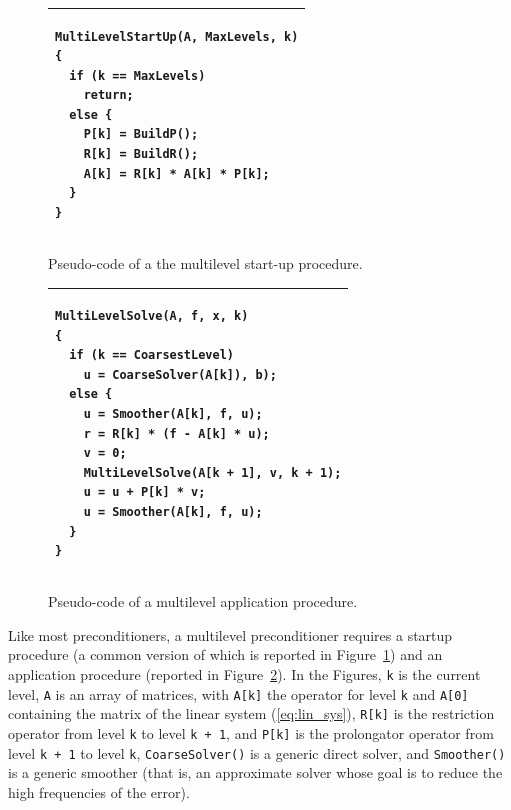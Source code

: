 \documentclass{article}[11pt]
\begin{document}
\smallskip

\begin{figure}
\begin{center}
\begin{tabular}{ p{12cm} }
\hline
\vspace*{0.1cm}
\hspace*{1cm}
\begin{minipage}{10cm}
\begin{verbatim}
MultiLevelStartUp(A, MaxLevels, k)
{
  if (k == MaxLevels)
    return;
  else {
    P[k] = BuildP(); 
    R[k] = BuildR();
    A[k] = R[k] * A[k] * P[k];
  }
}
\end{verbatim}
\vspace*{0.1cm}
\end{minipage} \\
\hline
\end{tabular}
\caption{Pseudo-code of a the multilevel start-up procedure.}
\label{fig:startup}
\end{center}
\end{figure}

\begin{figure}
\begin{center}
\begin{tabular}{ p{12cm} }
\hline
\vspace*{0.1cm}
\hspace*{1cm}
\begin{minipage}{10cm}
\begin{verbatim}
MultiLevelSolve(A, f, x, k) 
{
  if (k == CoarsestLevel)
    u = CoarseSolver(A[k]), b);
  else {
    u = Smoother(A[k], f, u);
    r = R[k] * (f - A[k] * u);
    v = 0;
    MultiLevelSolve(A[k + 1], v, k + 1);
    u = u + P[k] * v;
    u = Smoother(A[k], f, u);
  }
}
\end{verbatim}
\vspace*{0.1cm}
\end{minipage} \\
\hline
\end{tabular}
\caption{Pseudo-code of a multilevel application procedure.}
\label{fig:application}
\end{center}
\end{figure}

Like most preconditioners, a multilevel preconditioner requires a startup 
procedure (a common version of which is reported in Figure~\ref{fig:startup})
  and an application procedure (reported in Figure~\ref{fig:application}).
In the Figures, \verb!k! is the current level,
\verb!A! is an array of matrices, with \verb!A[k]! the operator for 
level \verb!k! and \verb!A[0]! containing the matrix of the linear system 
(\ref{eq:lin_sys}), 
\verb!R[k]! is the restriction operator from level \verb!k! 
to level \verb!k + 1!, and \verb!P[k]! is the prolongator
operator from level \verb!k + 1! to level \verb!k!,
\verb!CoarseSolver()! is a generic direct solver, and
\verb!Smoother()! is a generic smoother (that is, an approximate solver
whose goal is to reduce the high frequencies of the error).
\end{document}
